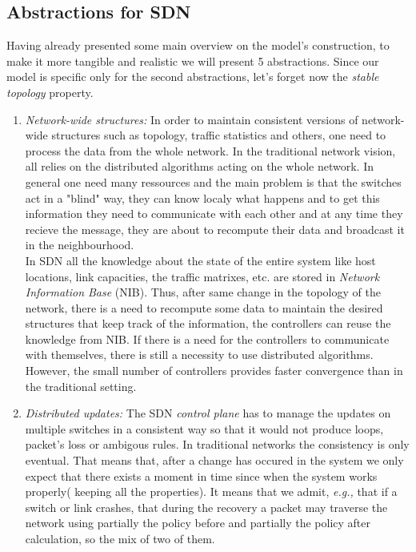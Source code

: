 \documentclass{article}
\begin{document}
\subsection{Abstractions for SDN}
Having already presented some main overview on the model's construction, to make it more tangible and realistic we will present 5 abstractions. Since our model is specific only for the second abstractions, let's forget now the \emph{stable topology} property.
\begin{enumerate}
\item \emph{Network-wide structures:}
In order to maintain consistent versions of network-wide structures such as topology, traffic statistics and others, one need to process the data from the whole network. In the traditional network vision, all relies on the distributed algorithms acting on the whole network. In general one need many ressources and the main problem is that the switches act in a "blind" way, they can know localy what happens and  to get this information they need to communicate with each other and at any time they recieve the message, they are about to recompute their data and broadcast it in the neighbourhood. \\
In SDN all the knowledge about the state of the entire  system like host locations, link capacities, the traffic matrixes, etc. are stored in \emph{Network Information Base} (NIB). Thus, after same change in the topology of the network, there is a need to recompute some data to maintain the desired structures that keep track of the information, the controllers can reuse the knowledge from NIB. If there is a need for the controllers to communicate with themselves, there is still a necessity to use distributed algorithms. However, the small number of controllers provides faster convergence than in the traditional setting.  
\item \emph{Distributed updates:}
The SDN \emph{control plane} has to manage the updates on multiple switches in a consistent way so that it would not produce loops, packet's loss or ambigous rules. 
In traditional networks the consistency is only eventual. That means that, after a change has occured in the system we only expect that there exists a moment in time since when the system works properly( keeping all the properties). It means that we admit, \emph{e.g.,} that if a switch or link crashes, that during the recovery a packet may traverse the network using partially the policy before and partially the policy after calculation, so the mix of two of them. 

\end{enumerate}
\end{document}
